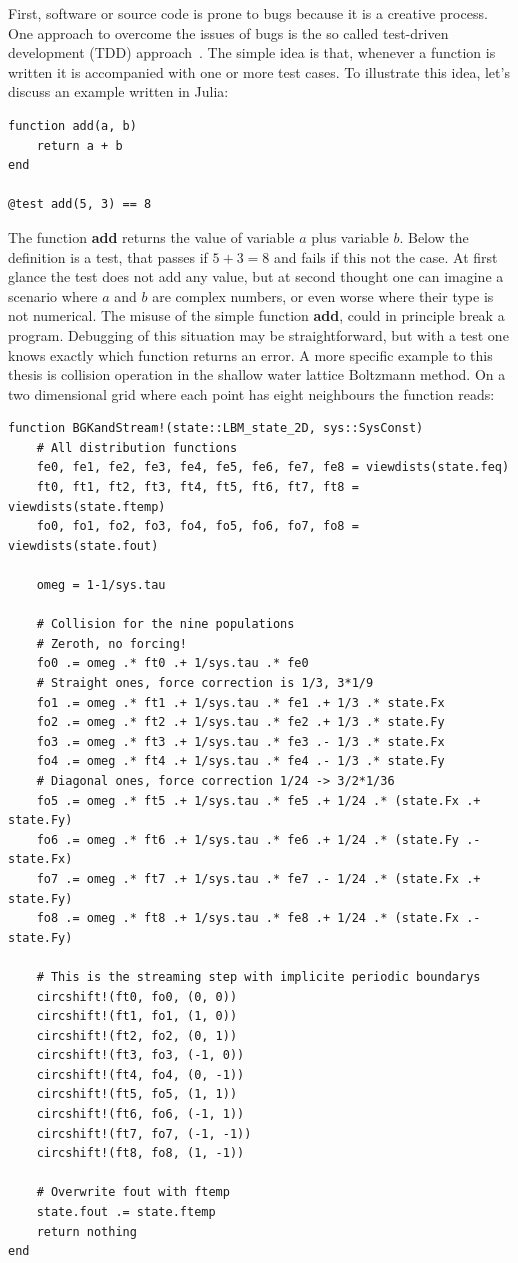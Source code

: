 First, software or source code is prone to bugs because it is a creative process.
One approach to overcome the issues of bugs is the so called test-driven development (TDD) approach~\cite{beckTestdrivenDevelopmentExample2003}.
The simple idea is that, whenever a function is written it is accompanied with one or more test cases.
To illustrate this idea, let's discuss an example written in Julia:
\begin{verbatim}
function add(a, b)
    return a + b
end

@test add(5, 3) == 8
\end{verbatim}
The function \textbf{add} returns the value of variable $a$ plus variable $b$.
Below the definition is a test, that passes if $5 + 3 = 8$ and fails if this not the case.
At first glance the test does not add any value, but at second thought one can imagine a scenario where $a$ and $b$ are complex numbers, or even worse where their type is not numerical.
The misuse of the simple function \textbf{add}, could in principle break a program.
Debugging of this situation may be straightforward, but with a test one knows exactly which function returns an error.
A more specific example to this thesis is collision operation in the shallow water lattice Boltzmann method.
On a two dimensional grid where each point has eight neighbours the function reads:
\begin{verbatim}
function BGKandStream!(state::LBM_state_2D, sys::SysConst)
    # All distribution functions
    fe0, fe1, fe2, fe3, fe4, fe5, fe6, fe7, fe8 = viewdists(state.feq)
    ft0, ft1, ft2, ft3, ft4, ft5, ft6, ft7, ft8 = viewdists(state.ftemp)
    fo0, fo1, fo2, fo3, fo4, fo5, fo6, fo7, fo8 = viewdists(state.fout)

    omeg = 1-1/sys.tau

    # Collision for the nine populations
    # Zeroth, no forcing!
    fo0 .= omeg .* ft0 .+ 1/sys.tau .* fe0
    # Straight ones, force correction is 1/3, 3*1/9
    fo1 .= omeg .* ft1 .+ 1/sys.tau .* fe1 .+ 1/3 .* state.Fx
    fo2 .= omeg .* ft2 .+ 1/sys.tau .* fe2 .+ 1/3 .* state.Fy
    fo3 .= omeg .* ft3 .+ 1/sys.tau .* fe3 .- 1/3 .* state.Fx
    fo4 .= omeg .* ft4 .+ 1/sys.tau .* fe4 .- 1/3 .* state.Fy
    # Diagonal ones, force correction 1/24 -> 3/2*1/36
    fo5 .= omeg .* ft5 .+ 1/sys.tau .* fe5 .+ 1/24 .* (state.Fx .+ state.Fy)
    fo6 .= omeg .* ft6 .+ 1/sys.tau .* fe6 .+ 1/24 .* (state.Fy .- state.Fx)
    fo7 .= omeg .* ft7 .+ 1/sys.tau .* fe7 .- 1/24 .* (state.Fx .+ state.Fy)
    fo8 .= omeg .* ft8 .+ 1/sys.tau .* fe8 .+ 1/24 .* (state.Fx .- state.Fy)

    # This is the streaming step with implicite periodic boundarys
    circshift!(ft0, fo0, (0, 0))
    circshift!(ft1, fo1, (1, 0))
    circshift!(ft2, fo2, (0, 1))
    circshift!(ft3, fo3, (-1, 0))
    circshift!(ft4, fo4, (0, -1))
    circshift!(ft5, fo5, (1, 1))
    circshift!(ft6, fo6, (-1, 1))
    circshift!(ft7, fo7, (-1, -1))
    circshift!(ft8, fo8, (1, -1))
    
    # Overwrite fout with ftemp
    state.fout .= state.ftemp
    return nothing
end
\end{verbatim}

